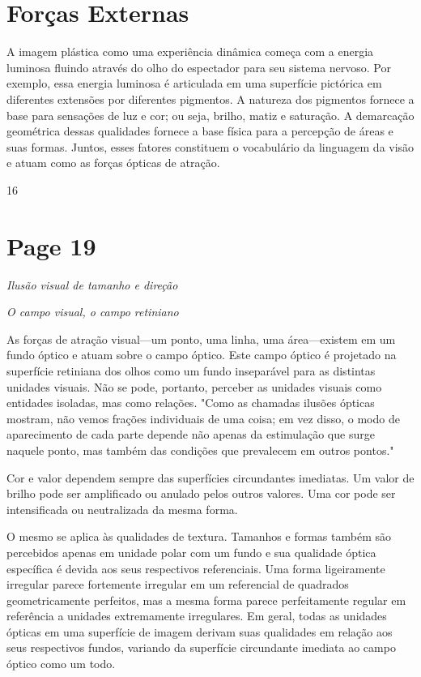 \documentclass[a4paper]{article}
\begin{document}
\section*{Forças Externas}

A imagem plástica como uma experiência dinâmica começa com a energia luminosa fluindo através do olho do espectador para seu sistema nervoso. Por exemplo, essa energia luminosa é articulada em uma superfície pictórica em diferentes extensões por diferentes pigmentos. A natureza dos pigmentos fornece a base para sensações de luz e cor; ou seja, brilho, matiz e saturação. A demarcação geométrica dessas qualidades fornece a base física para a percepção de áreas e suas formas. Juntos, esses fatores constituem o vocabulário da linguagem da visão e atuam como as forças ópticas de atração.

\vfill
16

\newpage
\section*{Page 19}

\begin{center}
\textit{Ilusão visual de tamanho e direção}
\end{center}

\vspace{1em}

\textit{O campo visual, o campo retiniano}

As forças de atração visual---um ponto, uma linha, uma área---existem em um fundo óptico e atuam sobre o campo óptico. Este campo óptico é projetado na superfície retiniana dos olhos como um fundo inseparável para as distintas unidades visuais. Não se pode, portanto, perceber as unidades visuais como entidades isoladas, mas como relações. "Como as chamadas ilusões ópticas mostram, não vemos frações individuais de uma coisa; em vez disso, o modo de aparecimento de cada parte depende não apenas da estimulação que surge naquele ponto, mas também das condições que prevalecem em outros pontos."\textbullet

Cor e valor dependem sempre das superfícies circundantes imediatas. Um valor de brilho pode ser amplificado ou anulado pelos outros valores. Uma cor pode ser intensificada ou neutralizada da mesma forma.

O mesmo se aplica às qualidades de textura. Tamanhos e formas também são percebidos apenas em unidade polar com um fundo e sua qualidade óptica específica é devida aos seus respectivos referenciais. Uma forma ligeiramente irregular parece fortemente irregular em um referencial de quadrados geometricamente perfeitos, mas a mesma forma parece perfeitamente regular em referência a unidades extremamente irregulares. Em geral, todas as unidades ópticas em uma superfície de imagem derivam suas qualidades em relação aos seus respectivos fundos, variando da superfície circundante imediata ao campo óptico como um todo.
\end{document}
